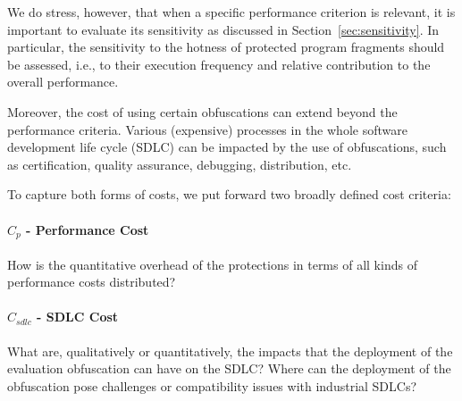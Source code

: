 We do stress, however, that when a specific performance criterion is relevant, it is important to evaluate its sensitivity as discussed in Section~\ref{sec:sensitivity}. In particular, the sensitivity to the hotness of protected program fragments should be assessed, i.e., to their execution frequency and relative contribution to the overall performance.

Moreover, the cost of using certain obfuscations can extend beyond the performance criteria. Various (expensive) processes in the whole software development life cycle (SDLC) can be impacted by the use of obfuscations, such as certification, quality assurance, debugging, distribution, etc. 

To capture both forms of costs, we put forward two broadly defined cost criteria:

\paragraph{$C_{p}$ - Performance Cost} How is the quantitative overhead of the protections in terms of all kinds of performance costs distributed? 

\paragraph{$C_{sdlc}$ - SDLC Cost} What are, qualitatively or quantitatively, the impacts that the deployment of the evaluation obfuscation can have on the SDLC? Where can the deployment of the obfuscation pose challenges or compatibility issues with industrial SDLCs?








